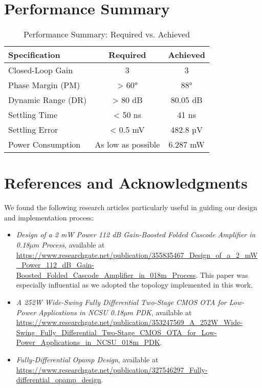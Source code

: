 \documentclass[a4paper,12pt]{article}
\begin{document}
\section{Performance Summary}
\begin{table}[H]
    \centering
    \begin{tabular}{|l|c|c|}
        \hline
        Specification & Required & Achieved \\
        \hline
        Closed-Loop Gain & 3 & 3 \\
        Phase Margin (PM) & > 60° & 88° \\
        Dynamic Range (DR) & > 80 dB & 80.05 dB \\
        Settling Time & < 50 ns & 41 ns \\
        Settling Error & < 0.5 mV & 482.8 µV \\
        Power Consumption & As low as possible & 6.287 mW \\
        \hline
    \end{tabular}
    \caption{Performance Summary: Required vs. Achieved}
    \label{tab:performance_summary}
\end{table}

\section{References and Acknowledgments}
We found the following research articles particularly useful in guiding our design and implementation process:

\begin{itemize}
\item \textit{Design of a 2 mW Power 112 dB Gain-Boosted Folded Cascode Amplifier in 0.18µm Process}, available at \url{https://www.researchgate.net/publication/355835467_Design_of_a_2_mW_Power_112_dB_Gain-Boosted_Folded_Cascode_Amplifier_in_018m_Process}. This paper was especially influential as we adopted the topology implemented in this work.
\item \textit{A 252W Wide-Swing Fully Differential Two-Stage CMOS OTA for Low-Power Applications in NCSU 0.18µm PDK}, available at \url{https://www.researchgate.net/publication/353247569_A_252W_Wide-Swing_Fully_Differential_Two-Stage_CMOS_OTA_for_Low-Power_Applications_in_NCSU_018m_PDK}.
\item \textit{Fully-Differential Opamp Design}, available at \url{https://www.researchgate.net/publication/327546297_Fully-differential_opamp_design}.
\end{itemize}
\end{document}
